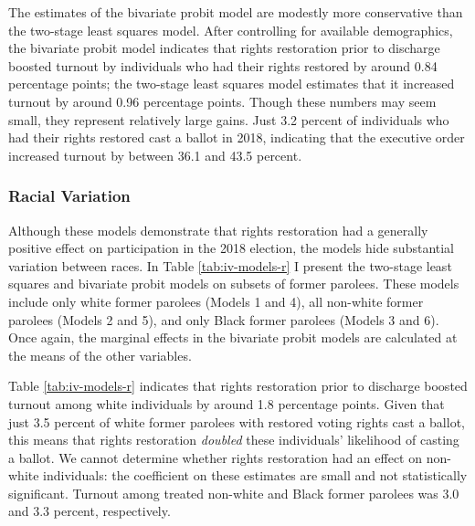 \documentclass[
  12pt,
]{article}
\begin{document}
The estimates of the bivariate probit model are modestly more conservative than the two-stage least squares model. After controlling for available demographics, the bivariate probit model indicates that rights restoration prior to discharge boosted turnout by individuals who had their rights restored by around 0.84 percentage points; the two-stage least squares model estimates that it increased turnout by around 0.96 percentage points. Though these numbers may seem small, they represent relatively large gains. Just 3.2 percent of individuals who had their rights restored cast a ballot in 2018, indicating that the executive order increased turnout by between 36.1 and 43.5 percent.

\hypertarget{racial-variation}{%
\subsubsection*{Racial Variation}\label{racial-variation}}

Although these models demonstrate that rights restoration had a generally positive effect on participation in the 2018 election, the models hide substantial variation between races. In Table \ref{tab:iv-models-r} I present the two-stage least squares and bivariate probit models on subsets of former parolees. These models include only white former parolees (Models 1 and 4), all non-white former parolees (Models 2 and 5), and only Black former parolees (Models 3 and 6). Once again, the marginal effects in the bivariate probit models are calculated at the means of the other variables.

\begin{singlespace}

\end{singlespace}

Table \ref{tab:iv-models-r} indicates that rights restoration prior to discharge boosted turnout among white individuals by around 1.8 percentage points. Given that just 3.5 percent of white former parolees with restored voting rights cast a ballot, this means that rights restoration \emph{doubled} these individuals' likelihood of casting a ballot. We cannot determine whether rights restoration had an effect on non-white individuals: the coefficient on these estimates are small and not statistically significant. Turnout among treated non-white and Black former parolees was 3.0 and 3.3 percent, respectively.
\end{document}
